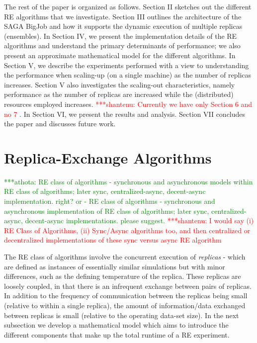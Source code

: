 \documentclass{rspublic}
\newcommand{\jhanote}[1]{ {\textcolor{red} { ***shantenu: #1 }}}
\newcommand{\alnote}[1]{ {\textcolor{blue} { ***andre: #1 }}}
\newcommand{\athotanote}[1]{ {\textcolor{green} { ***athota: #1 }}}
\newcommand{\alnote}[1]{}
\newcommand{\athotanote}[1]{}
\newcommand{\jhanote}[1]{}
\begin{document}
The rest of the paper is organized as follows. Section II sketches out
the different RE algorithms that we investigate. Section III outlines
the architecture of the SAGA BigJob and how it supports the dynamic
execution of multiple replicas (ensembles). In Section IV, we present
the implementation details of the RE algorithms and understand
the primary determinants of performance; we also present
an approximate mathematical model for the different algorithms.
In Section V, we describe the experiments performed with a view to
understanding the performance when scaling-up (on a single machine) as
the number of replicas increases. Section V also investigates the
scaling-out characteristics, namely performance as the number of
replicas are increased while the (distributed) resources employed
increases. %
\jhanote{Currently we have only Section 6 and no 7}. In Section VI, we
present the results and analysis.  Section VII concludes the paper and
discusses future work.


\section{Replica-Exchange Algorithms}
\label{sec:repex-approach}


\athotanote{RE class of algorithms - synchronous and asynchronous
  models within RE class of algorithms; later sync, centralized-async,
  decent-async implementation. right? or - RE class of algorithms -
  synchronous and asynchronous implementation of RE class of
  algorithms; later sync, centralized-async, decent-async
  implementations. please suggest.}  \jhanote{I would say (i) RE Class
  of Algorithms, (ii) Sync/Async algorithms too, and then centralized
  or decentralized implementations of these sync versus async RE
  algorithm}
  
The RE class of algorithms involve the concurrent execution of
\emph{replicas} - which are defined as instances of essentially
similar simulations but with minor differences, such as the defining
temperature of the replica. These replicas are loosely coupled, in
that there is an infrequent exchange between pairs of %
replicas. In addition to the
frequency of communication between the replicas being small (relative
to within a single replica), the amount of information/data exchanged
between replicas is small (relative to the operating data-set
size). In the next subsection we develop a mathematical model which
aims to introduce the different components that make up the total
runtime of a RE experiment.
\end{document}

